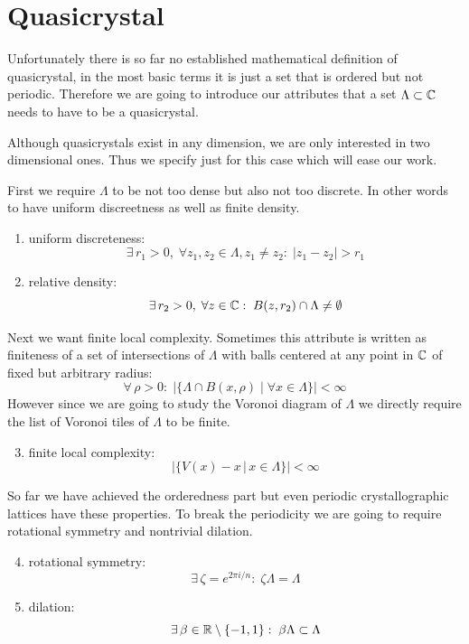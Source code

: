 \documentclass[text.tex]{subfiles}
\begin{document}
\section{Quasicrystal}\label{sec_quasicrystalEaseIn}%
Unfortunately there is so far no established mathematical definition of quasicrystal, in the most basic terms it is just a set that is ordered but not periodic. Therefore we are going to introduce our attributes that a set $\Lambda\subset\mathbb{C}$ needs to have to be a quasicrystal. 

Although quasicrystals exist in any dimension, we are only interested in two dimensional ones. Thus we specify just for this case which will ease our work. 

First we require $\Lambda$ to be not too dense but also not too discrete. In other words to have uniform discreetness as well as finite density. 

\begin{enumerate}
\item uniform discreteness: $$\exists\,r_1>0,\; \forall z_1,z_2\in\Lambda, z_1\neq z_2:\; |z_1-z_2|>r_1$$
\item relative density: $$\exists\,r_2>0,\; \forall z\in\mathbb{C}:\; B(z,r_2)\cap\Lambda \neq \emptyset$$
\end{enumerate}

Next we want finite local complexity. Sometimes this attribute is written as finiteness of a set of intersections of $\Lambda$ with balls centered at any point in $\mathbb{C}$ of fixed but arbitrary radius:
$$\forall\,\rho>0:\;\big|\{\Lambda\cap B(x,\rho)\;|\;\forall x\in\Lambda\}\big| < \infty$$
However since we are going to study the Voronoi diagram of $\Lambda$ we directly require the list of Voronoi tiles of $\Lambda$ to be finite. 

\begin{enumerate}
\setcounter{enumi}{2}
\item finite local complexity: $$\big|\{V(x)-x\,|\, x\in \Lambda\}\big|<\infty$$
\end{enumerate}

So far we have achieved the orderedness part but even periodic crystallographic lattices have these properties. To break the periodicity we are going to require rotational symmetry and nontrivial dilation.  

\begin{enumerate}
\setcounter{enumi}{3}
\item rotational symmetry: $$\exists\,\zeta = e^{2\pi i/n}:\; \zeta\Lambda = \Lambda$$
\item dilation: $$\exists\,\beta\in\mathbb{R}\setminus\{-1,1\}:\; \beta\Lambda\subset \Lambda$$
\end{enumerate}
\end{document}
